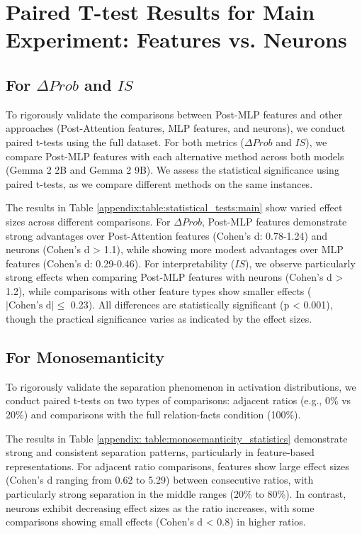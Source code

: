 \section{Paired T-test Results for Main Experiment: Features vs. Neurons}
\subsection{For $\Delta Prob$ and $IS$}
\label{subsection:appenidx:Paired T-test Results for prob and is}
To rigorously validate the comparisons between Post-MLP features and other approaches (Post-Attention features, MLP features, and neurons), we conduct paired t-tests using the full dataset. For both metrics ($\Delta Prob$ and $IS$), we compare Post-MLP features with each alternative method across both models (Gemma 2 2B and Gemma 2 9B). We assess the statistical significance using paired t-tests, as we compare different methods on the same instances.

The results in Table \ref{appendix:table:statistical_tests:main} show varied effect sizes across different comparisons. For $\Delta Prob$, Post-MLP features demonstrate strong advantages over Post-Attention features (Cohen's d: 0.78-1.24) and neurons (Cohen's d > 1.1), while showing more modest advantages over MLP features (Cohen's d: 0.29-0.46). For interpretability ($IS$), we observe particularly strong effects when comparing Post-MLP features with neurons (Cohen's d > 1.2), while comparisons with other feature types show smaller effects ($\lvert\text{Cohen's d}\rvert \leq$ 0.23). All differences are statistically significant (p < 0.001), though the practical significance varies as indicated by the effect sizes.


\subsection{For Monosemanticity}
\label{subsection:appenidx:Paired T-test Results for Monosemanticity}

To rigorously validate the separation phenomenon in activation distributions, we conduct paired t-tests on two types of comparisons: adjacent ratios (e.g., 0\% vs 20\%) and comparisons with the full relation-facts condition (100\%).

The results in Table \ref{appendix: table:monosemanticity_statistics} demonstrate strong and consistent separation patterns, particularly in feature-based representations. For adjacent ratio comparisons, features show large effect sizes (Cohen's d ranging from 0.62 to 5.29) between consecutive ratios, with particularly strong separation in the middle ranges (20\% to 80\%). In contrast, neurons exhibit decreasing effect sizes as the ratio increases, with some comparisons showing small effects (Cohen's d < 0.8) in higher ratios.

